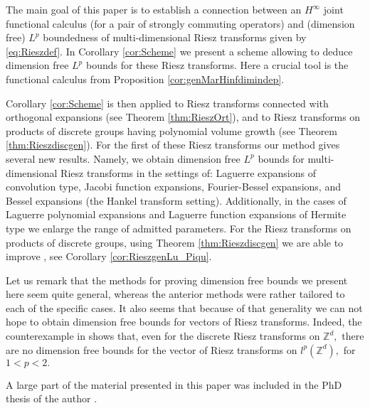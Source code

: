 \documentclass[leqno,12pt]{amsart}
\theoremstyle{definition}
\theoremstyle{remark}
\begin{document}
        The main goal of this paper is to establish a connection between an $H^{\infty}$ joint functional calculus (for a pair of strongly commuting operators) and (dimension free) $L^p$ boundedness of multi-dimensional Riesz transforms given by \eqref{eq:Rieszdef}. In Corollary \ref{cor:Scheme} we present a scheme allowing to deduce dimension free $L^p$ bounds for these Riesz transforms. Here a crucial tool is the functional calculus from Proposition \ref{cor:genMarHinfdimindep}.

         Corollary \ref{cor:Scheme} is then applied to Riesz transforms connected with orthogonal expansions (see Theorem \ref{thm:RieszOrt}), and to Riesz transforms on products of discrete groups having polynomial volume growth (see Theorem \ref{thm:Rieszdiscgen}). For the first of these Riesz transforms our method gives several new results. Namely, we obtain dimension free $L^p$ bounds for multi-dimensional Riesz transforms in the settings of: Laguerre expansions of convolution type, Jacobi function expansions, Fourier-Bessel expansions, and Bessel expansions (the Hankel transform setting). Additionally, in the cases of Laguerre polynomial expansions and Laguerre function expansions of Hermite type we enlarge the range of admitted parameters. For the Riesz transforms on products of discrete groups, using Theorem \ref{thm:Rieszdiscgen} we are able to improve \cite[Theorem 2.8]{Lu_Piqu1}, see Corollary \ref{cor:RieszgenLu_Piqu}.

        Let us remark that the methods for proving dimension free bounds we present here seem quite general, whereas the anterior methods were rather tailored to each of the specific cases. It also seems that because of that generality we can not hope to obtain dimension free bounds for vectors of Riesz transforms. Indeed, the counterexample in \cite[Proposition 2.9]{Lu_Piqu1} shows that, even for the discrete Riesz transforms on $\mathbb{Z}^d,$ there are no dimension free bounds for the vector of Riesz transforms on $l^p(\mathbb{Z}^d),$ for $1<p<2.$

        A large part of the material presented in this paper was included in the PhD thesis of the author \cite{PhD}.
\end{document}
